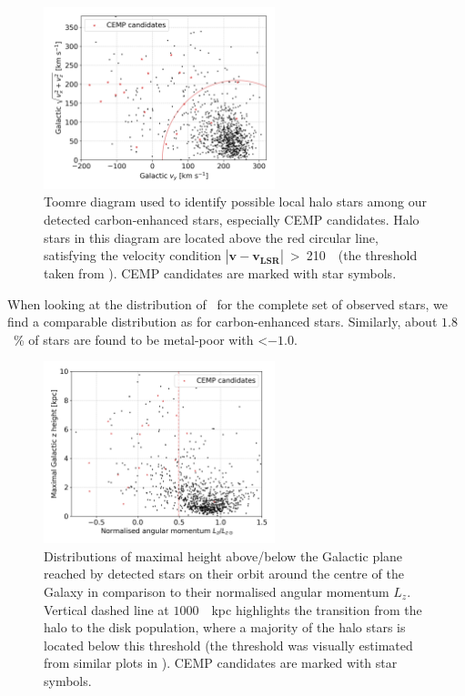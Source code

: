 \begin{figure}
	\centering
	\includegraphics[width=0.6\textwidth]{carbon_orbits_vy_vxvz.png}
	\caption{Toomre diagram used to identify possible local halo stars among our detected carbon-enhanced stars, especially CEMP candidates. Halo stars in this diagram are located above the red circular line, satisfying the velocity condition $\left|\mathbf{v} - \mathbf{v_{LSR}} \right|$~>~210~\kms\ (the threshold taken from \citet{2018ApJ...860L..11K}). CEMP candidates are marked with star symbols.}
	\label{fig:orbits_vxvyvz}
\end{figure}

When looking at the distribution of \Feh\ for the complete set of observed stars, we find a comparable distribution as for carbon-enhanced stars. Similarly, about $1.8$~\% of stars are found to be metal-poor with \Feh \textless $-1.0$.

\begin{figure}
	\centering
	\includegraphics[width=0.6\textwidth]{carbon_orbits_zmax_lznorm.png}
	\caption{Distributions of maximal height above/below the Galactic plane reached by detected stars on their orbit around the centre of the Galaxy in comparison to their normalised angular momentum $L_z$. Vertical dashed line at $1000$~\kms~kpc highlights the transition from the halo to the disk population, where a majority of the halo stars is located below this threshold (the threshold was visually estimated from similar plots in \citet{2018ApJ...860L..11K}).  CEMP candidates are marked with star symbols.}
	\label{fig:orbits_zmax}
\end{figure}

